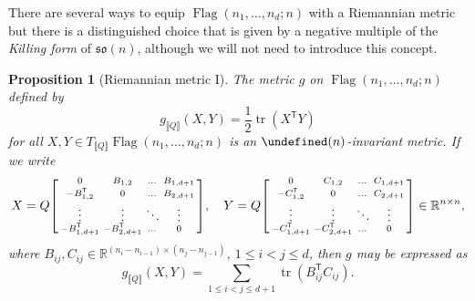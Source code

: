 \documentclass[11pt,reqno]{amsart}%
\newtheorem{proposition}[theorem]{Proposition}
\theoremstyle{definition}
\theoremstyle{remark}
\newcommand{\tp}{{\scriptscriptstyle\mathsf{T}}}
\newcommand{\lb}{\llbracket}
\newcommand{\rb}{\rrbracket}
\let\SO\undefined
\DeclareMathOperator{\Flag}{Flag}
\DeclareMathOperator{\SO}{SO}
\DeclareMathOperator{\tr}{tr}
\begin{document}
There are several ways to equip $\Flag(n_1,\dots, n_d;n)$ with a Riemannian metric but there is a distinguished choice that is given by a negative multiple of the \emph{Killing form} of $\mathfrak{so}(n)$, although we will not need to introduce this concept.
\begin{proposition}[Riemannian metric I]\label{prop:metric}
The metric $g$ on $\Flag(n_1,\dots, n_d;n)$ defined by
\begin{equation}\label{eq:metric1}
g_{\lb Q \rb} (X,Y) = \frac{1}{2} \tr(X^\tp  Y)
\end{equation}
for all $X,Y\in T_{\lb Q \rb} \Flag(n_1,\dots, n_d;n)$ is an $\SO(n)$-invariant metric. If we write 
\[
X = Q\begin{bsmallmatrix}
0 & B_{1,2}  &\dots & B_{1,d+1} \\
-B_{1,2}^\tp  & 0   &\dots & B_{2,d+1} \\
\vdots & \vdots & \ddots & \vdots\\
-B_{1,d+1}^\tp  & -B_{2,d+1}^\tp  & \dots & 0
\end{bsmallmatrix}, \quad 
Y = Q\begin{bsmallmatrix}
0 & C_{1,2}  &\dots & C_{1,d+1} \\
-C_{1,2}^\tp  & 0   &\dots & C_{2,d+1} \\
\vdots & \vdots & \ddots & \vdots\\
-C_{1,d+1}^\tp  & -C_{2,d+1}^\tp  & \dots & 0
\end{bsmallmatrix}  \in \mathbb{R}^{n \times n},
\]
where $B_{ij}, C_{ij}\in \mathbb{R}^{(n_i-n_{i-1}) \times (n_j-n_{j-1})}$, $1\le i < j \le d$, then $g$ may be expressed as
\begin{equation}\label{eq:metric2}
g_{\lb Q \rb}  (X, Y) = \sum_{1\le i < j \le d+1} \tr (B_{ij}^\tp  C_{ij}).
\end{equation}
\end{proposition}
\end{document}

